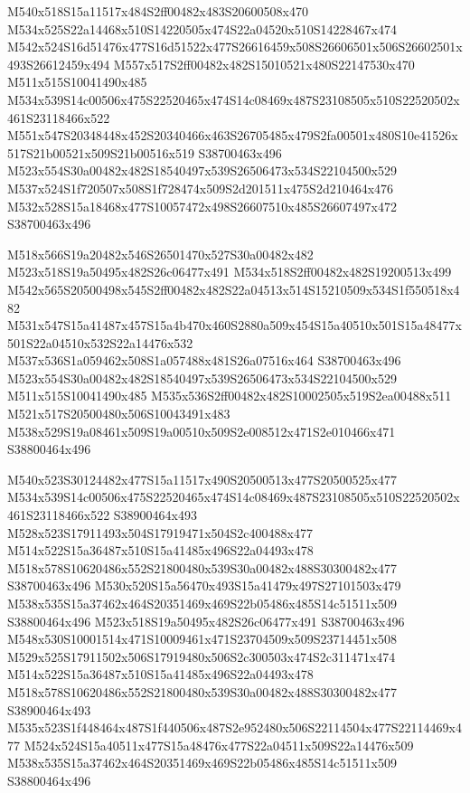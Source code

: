 \documentclass{article}
\begin{document}
\begin{multicols}{2}
M540x518S15a11517x484S2ff00482x483S20600508x470 M534x525S22a14468x510S14220505x474S22a04520x510S14228467x474 M542x524S16d51476x477S16d51522x477S26616459x508S26606501x506S26602501x493S26612459x494 M557x517S2ff00482x482S15010521x480S22147530x470 M511x515S10041490x485 M534x539S14c00506x475S22520465x474S14c08469x487S23108505x510S22520502x461S23118466x522 M551x547S20348448x452S20340466x463S26705485x479S2fa00501x480S10e41526x517S21b00521x509S21b00516x519 S38700463x496 M523x554S30a00482x482S18540497x539S26506473x534S22104500x529 M537x524S1f720507x508S1f728474x509S2d201511x475S2d210464x476 M532x528S15a18468x477S10057472x498S26607510x485S26607497x472 S38700463x496

M518x566S19a20482x546S26501470x527S30a00482x482 M523x518S19a50495x482S26c06477x491 M534x518S2ff00482x482S19200513x499 M542x565S20500498x545S2ff00482x482S22a04513x514S15210509x534S1f550518x482 M531x547S15a41487x457S15a4b470x460S2880a509x454S15a40510x501S15a48477x501S22a04510x532S22a14476x532 M537x536S1a059462x508S1a057488x481S26a07516x464 S38700463x496 M523x554S30a00482x482S18540497x539S26506473x534S22104500x529 M511x515S10041490x485 M535x536S2ff00482x482S10002505x519S2ea00488x511 M521x517S20500480x506S10043491x483 M538x529S19a08461x509S19a00510x509S2e008512x471S2e010466x471 S38800464x496

M540x523S30124482x477S15a11517x490S20500513x477S20500525x477 M534x539S14c00506x475S22520465x474S14c08469x487S23108505x510S22520502x461S23118466x522 S38900464x493 M528x523S17911493x504S17919471x504S2c400488x477 M514x522S15a36487x510S15a41485x496S22a04493x478 M518x578S10620486x552S21800480x539S30a00482x488S30300482x477 S38700463x496 M530x520S15a56470x493S15a41479x497S27101503x479 M538x535S15a37462x464S20351469x469S22b05486x485S14c51511x509 S38800464x496 M523x518S19a50495x482S26c06477x491 S38700463x496 M548x530S10001514x471S10009461x471S23704509x509S23714451x508 M529x525S17911502x506S17919480x506S2c300503x474S2c311471x474 M514x522S15a36487x510S15a41485x496S22a04493x478 M518x578S10620486x552S21800480x539S30a00482x488S30300482x477 S38900464x493 M535x523S1f448464x487S1f440506x487S2e952480x506S22114504x477S22114469x477 M524x524S15a40511x477S15a48476x477S22a04511x509S22a14476x509 M538x535S15a37462x464S20351469x469S22b05486x485S14c51511x509 S38800464x496


\end{multicols}
\end{document}
